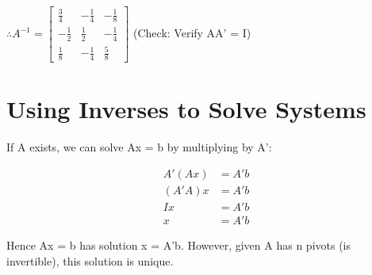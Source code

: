 \documentclass[12pt,a4paper]{article}
\begin{document}
$\therefore A^{-1} = \begin{bmatrix} \frac{3}{4} & -\frac{1}{4} & -\frac{1}{8} \\ -\frac{1}{2} & \frac{1}{2} & -\frac{1}{4} \\ \frac{1}{8} & -\frac{1}{4} & \frac{5}{8} \end{bmatrix}$ (Check: Verify AA' = I)

\section{Using Inverses to Solve Systems}

If A exists, we can solve Ax = b by multiplying by A':

\begin{align*}
A'(Ax) &= A'b \\
(A'A)x &= A'b \\
Ix &= A'b \\
x &= A'b
\end{align*}

Hence Ax = b has solution x = A'b. However, given A has n pivots (is invertible), this solution is unique.
\end{document}
